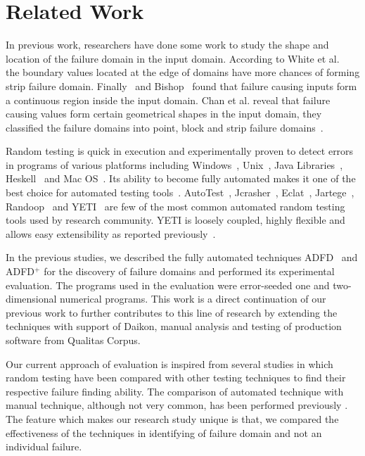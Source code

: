 \section{Related Work}
In previous work, researchers have done some work to study the shape and location of the failure domain in the input domain. According to White et al.~\cite{white1980domain} the boundary values located at the edge of domains have more chances of forming strip failure domain. Finally~\cite{finelli1991nasa} and Bishop~\cite{bishop1993variation} found that failure causing inputs form a continuous region inside the input domain. Chan et al. reveal that failure causing values form certain geometrical shapes in the input domain, they classified the failure domains into point, block and strip failure domains~\cite{chan1996proportional}. 

Random testing is quick in execution and experimentally proven to detect errors in programs of various platforms including Windows~\cite{forrester2000empirical}, Unix~\cite{miller1990empirical}, Java Libraries~\cite{pacheco2005eclat}, Heskell~\cite{claessen2011quickcheck} and Mac OS~\cite{miller2006empirical}.  Its ability to become fully automated makes it one of the best choice for automated testing tools~\cite{csallner2004jcrasher, pacheco2005eclat}. AutoTest~\cite{ciupa2008predictability}, Jcrasher~\cite{csallner2004jcrasher}, Eclat~\cite{pacheco2005eclat}, Jartege~\cite{oriat2005jartege}, Randoop~\cite{pacheco2007randoop} and YETI~\cite{oriol2012random, ahmad2013adfd, ahmad2014adfd2} are few of the most common automated random testing tools used by research community. YETI is loosely coupled, highly flexible and allows easy extensibility as reported previously~\cite{oriol2010testing}. 

In the previous studies, we described the fully automated techniques ADFD~\cite{ahmad2013adfd} and ADFD$^+$ \cite{ahmad2014adfd2} for the discovery of failure domains and performed its experimental evaluation. The programs used in the evaluation were error-seeded one and two-dimensional numerical programs. This work is a direct continuation of our previous work to further contributes to this line of research by extending the techniques with support of Daikon, manual analysis and testing of production software from Qualitas Corpus. 

Our current approach of evaluation is inspired from several studies \cite{hamlet1990partition, weyuker1991analyzing, gutjahr1999partition} in which random testing have been compared with other testing techniques to find their respective failure finding ability. The comparison of automated technique with manual technique, although not very common, has been performed previously \cite{leitner2007reconciling, ciupa2008finding}. The feature which makes our research study unique is that, we compared the effectiveness of the techniques in identifying of failure domain and not an individual failure. 



